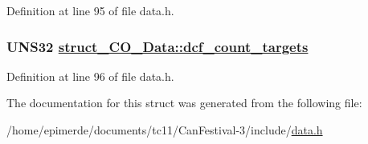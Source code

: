 Definition at line 95 of file data.h.\hypertarget{structstruct__CO__Data_0a588710c53092b75cfe284ca7d9ccff}{
\subsubsection[dcf\_\-count\_\-targets]{\setlength{\rightskip}{0pt plus 5cm}UNS32 \hyperlink{structstruct__CO__Data_0a588710c53092b75cfe284ca7d9ccff}{struct\_\-CO\_\-Data::dcf\_\-count\_\-targets}}}
\label{structstruct__CO__Data_0a588710c53092b75cfe284ca7d9ccff}




Definition at line 96 of file data.h.

The documentation for this struct was generated from the following file:\begin{CompactItemize}
\item 
/home/epimerde/documents/tc11/Can\-Festival-3/include/\hyperlink{data_8h}{data.h}\end{CompactItemize}
